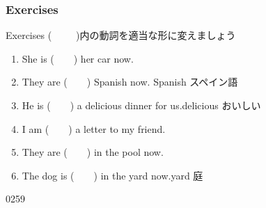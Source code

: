 \documentclass[aspectratio=169,xcolor={dvipsnames,table}]{beamer}
\newcommand{\myaudio}[1]{\href{#1}{\faVolumeUp}}
\begin{document}
\subsubsection{Exercises}
\begin{frame}[plain]{Exercises}
(~~~~~)内の動詞を適当な形に変えましょう
\begin{enumerate}
 \item She is (~~~~) her car now.
 \item They are (~~~~) Spanish now. \hfill{\scriptsize Spanish  スペイン語}
 \item He is  (~~~~) a delicious dinner for us.\hfill{\scriptsize  delicious  おいしい}
 \item I am (~~~~) a letter to my friend.
 \item They are (~~~~) in the pool now.
 \item The dog is (~~~~) in the yard now.\hfill{\scriptsize yard  庭}
\end{enumerate} 

\hfill{\tiny 0259}\,{\scriptsize \myaudio{./audio/021_is_ing_intro_04.mp3}}
\end{frame}
\end{document}
